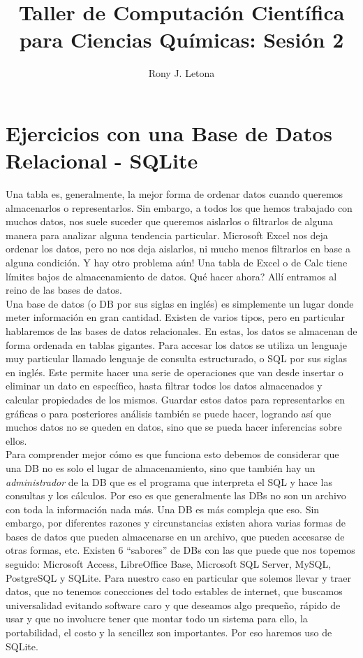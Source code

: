 \documentclass[10pt,letterpaper]{article}
\author{Rony J. Letona}
\title{Taller de Computaci\'on Cient\'ifica para Ciencias Qu\'imicas: Sesi\'on 2}
\begin{document}
\maketitle

\section{Ejercicios con una Base de Datos Relacional - SQLite}
Una tabla es, generalmente, la mejor forma de ordenar datos cuando queremos almacenarlos o representarlos. Sin embargo, a todos los que hemos trabajado con muchos datos, nos suele suceder que queremos aislarlos o filtrarlos de alguna manera para analizar alguna tendencia particular. Microsoft Excel nos deja ordenar los datos, pero no nos deja aislarlos, ni mucho menos filtrarlos en base a alguna condici\'on. Y hay otro problema a\'un! Una tabla de Excel o de Calc tiene l\'imites bajos de almacenamiento de datos. Qu\'e hacer ahora? All\'i entramos al reino de las bases de datos.\\

Una base de datos (o DB por sus siglas en ingl\'es) es simplemente un lugar donde meter informaci\'on en gran cantidad. Existen de varios tipos, pero en particular hablaremos de las bases de datos relacionales. En estas, los datos se almacenan de forma ordenada en tablas gigantes. Para accesar los datos se utiliza un lenguaje muy particular llamado lenguaje de consulta estructurado, o SQL por sus siglas en ingl\'es. Este permite hacer una serie de operaciones que van desde insertar o eliminar un dato en espec\'ifico, hasta filtrar todos los datos almacenados y calcular propiedades de los mismos. Guardar estos datos para representarlos en gr\'aficas o para posteriores an\'alisis tambi\'en se puede hacer, logrando as\'i que muchos datos no se queden en datos, sino que se pueda hacer inferencias sobre ellos.\\

Para comprender mejor c\'omo es que funciona esto debemos de considerar que una DB no es solo el lugar de almacenamiento, sino que tambi\'en hay un \emph{administrador} de la DB que es el programa que interpreta el SQL y hace las consultas y los c\'alculos. Por eso es que generalmente las DBs no son un archivo con toda la informaci\'on nada m\'as. Una DB es m\'as compleja que eso. Sin embargo, por diferentes razones y circunstancias existen ahora varias formas de bases de datos que pueden almacenarse en un archivo, que pueden accesarse de otras formas, etc. Existen 6 ``sabores'' de DBs con las que puede que nos topemos seguido: Microsoft Access, LibreOffice Base, Microsoft SQL Server, MySQL, PostgreSQL y SQLite. Para nuestro caso en particular que solemos llevar y traer datos, que no tenemos conecciones del todo estables de internet, que buscamos universalidad evitando software caro y que deseamos algo preque\~no, r\'apido de usar y que no involucre tener que montar todo un sistema para ello, la portabilidad, el costo y la sencillez son importantes. Por eso haremos uso de SQLite.
\newpage
\end{document}
